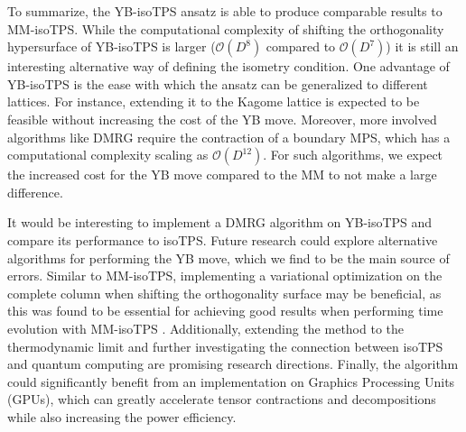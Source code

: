 To summarize, the YB-isoTPS ansatz is able to produce comparable results to MM-isoTPS. While the computational complexity of shifting the orthogonality hypersurface of YB-isoTPS is larger ($\mathcal{O}(D^8)$ compared to $\mathcal{O}(D^7)$) it is still an interesting alternative way of defining the isometry condition. One advantage of YB-isoTPS is the ease with which the ansatz can be generalized to different lattices. For instance, extending it to the Kagome lattice is expected to be feasible without increasing the cost of the YB move. Moreover, more involved algorithms like DMRG require the contraction of a boundary MPS, which has a computational complexity scaling as $\mathcal{O}(D^{12})$. For such algorithms, we expect the increased cost for the YB move compared to the MM to not make a large difference. \par
It would be interesting to implement a DMRG algorithm on YB-isoTPS and compare its performance to isoTPS. Future research could explore alternative algorithms for performing the YB move, which we find to be the main source of errors. Similar to MM-isoTPS, implementing a variational optimization on the complete column when shifting the orthogonality surface may be beneficial, as this was found to be essential for achieving good results when performing time evolution with MM-isoTPS \cite{cite:efficient_simulation_of_dynamics_in_two_dimensional_quantum_spin_systems}. Additionally, extending the method to the thermodynamic limit and further investigating the connection between isoTPS and quantum computing \cite{cite:topological_quantum_phase_transitions_in_2D_isometric_tensor_networks, cite:quantum_circuits_for_2D_isometric_tensor_networks} are promising research directions. Finally, the algorithm could significantly benefit from an implementation on Graphics Processing Units (GPUs), which can greatly accelerate tensor contractions and decompositions while also increasing the power efficiency.